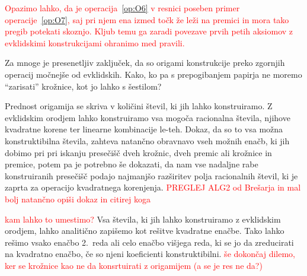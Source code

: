 \textcolor{red}{Opazimo lahko, da je operacija~\ref{op:O6} v resnici poseben primer operacije~\ref{op:O7}, saj pri njem ena izmed točk že leži na premici in mora tako pregib potekati skoznjo. Kljub temu ga zaradi povezave prvih petih aksiomov z evklidskimi konstrukcijami ohranimo med pravili.}

Za mnoge je presenetljiv zaključek, da so origami konstrukcije preko zgornjih operacij močnejše od evklidskih. Kako, ko pa s prepogibanjem papirja ne moremo ``zarisati'' krožnice, kot jo lahko s šestilom?

Prednost origamija se skriva v količini števil, ki jih lahko konstruiramo. Z evklidskim orodjem lahko konstruiramo vsa mogoča racionalna števila, njihove kvadratne korene ter linearne kombinacije le-teh. Dokaz, da so to vsa možna konstruktibilna števila, zahteva natančno obravnavo vseh možnih enačb, ki jih dobimo pri pri iskanju presečišč dveh krožnic, dveh premic ali krožnice in premice, potem pa je potrebno še dokazati, da nam vse nadaljne rabe konstruiranih presečišč podajo najmanjšo razširitev polja racionalnih števil, ki je zaprta za operacijo kvadratnega korenjenja. \textcolor{red}{PREGLEJ ALG2 od Brešarja in mal bolj natančno opiši dokaz in citirej koga} 

\textcolor{red}{kam lahko to umestimo?} Vsa števila, ki jih lahko konstruiramo z evklidskim orodjem, lahko analitično zapišemo kot rešitve kvadratne enačbe. Tako lahko rešimo vsako enačbo 2.\ reda ali celo enačbo višjega reda, ki se jo da zreducirati na kvadratno enačbo, če so njeni koeficienti konstruktibilni. \textcolor{red}{še dokončaj dilemo, ker se krožnice kao ne da konsrtuirati z origamijem (a se je res ne da?)}